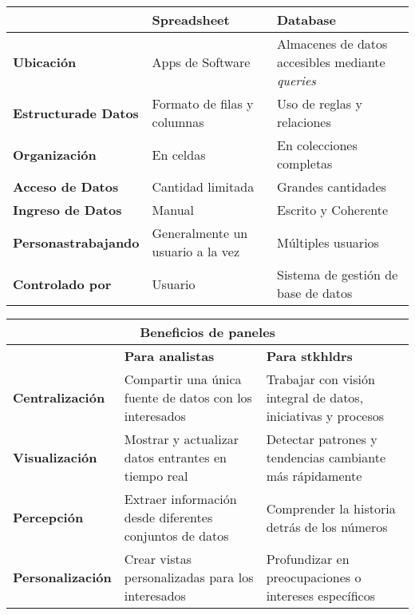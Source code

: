 \begin{table}
    \centering
    \begin{tabular}{|p{3.5cm}|p{5.5cm}|p{5.5cm}|}
        \hline
        & \textbf{Spreadsheet} & \textbf{Database} \\
        \hline
        \textbf{Ubicación} & Apps de Software & Almacenes de datos accesibles mediante \textit{queries} \\
        \hline
        \textbf{Estructura\break de Datos} & Formato de filas y columnas & Uso de reglas y relaciones \\
        \hline
        \textbf{Organización} & En celdas & En colecciones completas \\
        \hline
        \textbf{Acceso de Datos} & Cantidad limitada & Grandes cantidades \\
        \hline
        \textbf{Ingreso de Datos} & Manual & Escrito y Coherente \\
        \hline
        \textbf{Personas\break trabajando} & Generalmente un usuario a la vez & Múltiples usuarios \\
        \hline
        \textbf{Controlado por} & Usuario & Sistema de gestión de base de datos \\
        \hline
    \end{tabular}
\end{table}

\begin{table}
    \centering
    \begin{tabular}{|p{2.9cm}|p{5.4cm}|p{5.5cm}|}
        \hline
        \multicolumn{3}{|c|}{Beneficios de paneles} \\
        \hline
        & \textbf{Para analistas} & \textbf{Para \Gls{stkhldrs}} \\
        \hline
        \small{\textbf{Centralización}} & Compartir una única fuente de datos con los interesados & Trabajar con visión integral de datos, iniciativas y procesos \\
        \hline
        \small{\textbf{Visualización}} & Mostrar y actualizar datos \break entrantes en tiempo real & Detectar patrones y tendencias cambiante más rápidamente \\
        \hline
         \small{\textbf{Percepción}} & Extraer información desde \break diferentes conjuntos de datos & Comprender la historia detrás de los números \\
        \hline
        \small{\textbf{Personalización}} & Crear vistas personalizadas para los interesados & Profundizar en preocupaciones o intereses específicos \\
        \hline
    \end{tabular}
\end{table}


